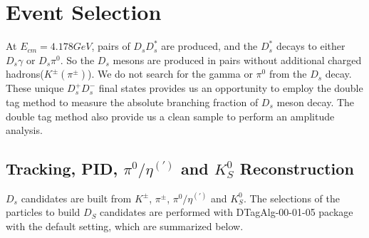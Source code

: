 \section{Event Selection}
\label{ST-selection}
At $E_{cm} = 4.178 GeV$, pairs of $D_{s}D_{s}^{*}$ are produced,  and the $D_{s}^{*}$ decays to either $D_{s}\gamma$ or $D_{s}\pi^{0}$.
So the $D_{s}$ mesons are produced in pairs without additional charged hadrons($K^{\pm}(\pi^{\pm})$).
We do not search for the gamma or $\pi^{0}$ from the $D_{s}$ decay. 
These unique $D_{s}^{+}D_{s}^{-}$ final states provides us an opportunity to employ the double tag method to measure the absolute branching fraction of $D_{s}$ meson decay.
The double tag method also provide us a clean sample to perform an amplitude analysis.


\subsection{Tracking, PID, $\pi^{0}/\eta^{(')}$ and $K_{S}^{0}$ Reconstruction }
$D_{s}$ candidates are built from $K^{\pm}$, $\pi^{\pm}$, $\pi^{0}/\eta^{(')}$ and $K_{S}^{0}$. The selections of the particles to build $D_{S}$ candidates are performed with DTagAlg-00-01-05 package with the default setting, which are summarized below.

